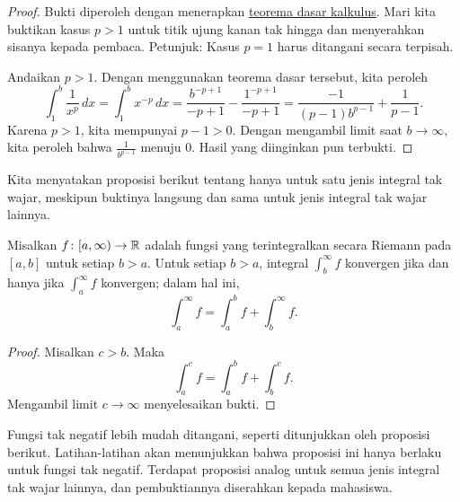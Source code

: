\begin{proof}
Bukti diperoleh dengan menerapkan
\hyperref[thm:FTCv1]{teorema dasar kalkulus}.
Mari kita buktikan kasus $p > 1$ untuk titik ujung kanan tak hingga dan
menyerahkan sisanya kepada pembaca.  Petunjuk: Kasus $p=1$ harus ditangani
secara terpisah.

Andaikan $p > 1$.  Dengan menggunakan
teorema dasar tersebut, kita peroleh
\begin{equation*}
\int_1^b \frac{1}{x^p} \,dx
=
\int_1^b x^{-p} \,dx
=
\frac{b^{-p+1}}{-p+1}
-
\frac{1^{-p+1}}{-p+1}
=
\frac{-1}{(p-1)b^{p-1}}
+
\frac{1}{p-1} .
\end{equation*}
Karena $p > 1$, kita mempunyai $p-1 > 0$.  Dengan mengambil limit saat $b \to \infty$,
kita peroleh bahwa $\frac{1}{b^{p-1}}$ menuju 0.  Hasil yang diinginkan pun terbukti.
\end{proof}

Kita menyatakan proposisi berikut tentang  hanya untuk satu jenis
integral tak wajar, meskipun buktinya langsung
dan sama untuk jenis integral tak wajar lainnya.

\begin{prop} \label{impropriemann:tail}
Misalkan $f \colon [a,\infty) \to {\mathbb{R}}$ adalah fungsi
yang terintegralkan secara Riemann pada $[a,b]$ untuk setiap $b > a$.
Untuk setiap $b > a$, integral
$\int_b^\infty f$ konvergen jika dan hanya jika $\int_a^\infty f$
konvergen; dalam hal ini,
\begin{equation*}
\int_a^\infty f
=
\int_a^b f +
\int_b^\infty f .
\end{equation*}
\end{prop}

\begin{proof}
Misalkan $c > b$.  Maka
\begin{equation*}
\int_a^c f
=
\int_a^b f +
\int_b^c f .
\end{equation*}
Mengambil limit $c \to \infty$ menyelesaikan bukti.
\end{proof}

Fungsi tak negatif lebih mudah ditangani,
seperti ditunjukkan oleh proposisi berikut.
Latihan-latihan akan menunjukkan bahwa proposisi ini
hanya berlaku untuk fungsi tak negatif.
Terdapat proposisi analog
untuk semua jenis integral tak wajar lainnya, dan pembuktiannya diserahkan kepada
mahasiswa.

